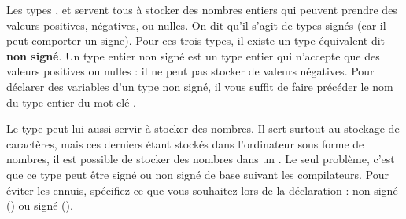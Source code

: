Les types ,  et  servent
tous à stocker des nombres entiers qui peuvent prendre des valeurs
positives, négatives, ou nulles. On dit qu'il s'agit de types signés
(car il peut comporter un signe). Pour ces trois types, il existe un
type équivalent dit \textbf{non signé}. Un type entier non signé est
un type entier qui n'accepte que des valeurs positives ou nulles : il
ne peut pas stocker de valeurs négatives. Pour déclarer des variables
d'un type non signé, il vous suffit de faire précéder le nom du type
entier du mot-clé .

Le type  peut lui aussi servir à stocker des nombres. Il
sert surtout au stockage de caractères, mais ces derniers étant
stockés dans l'ordinateur sous forme de nombres, il est possible de
stocker des nombres dans un . Le seul problème, c'est que
ce type peut être signé ou non signé de base suivant les
compilateurs. Pour éviter les ennuis, spécifiez ce que vous souhaitez
lors de la déclaration : non signé () ou signé
().

